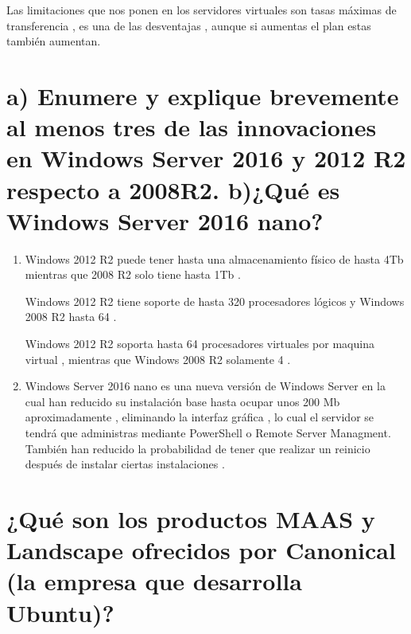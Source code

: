 Las limitaciones que nos ponen en los servidores virtuales son tasas máximas de transferencia , es una de las desventajas , aunque si aumentas el plan estas también aumentan.



\section{a) Enumere y explique brevemente al menos tres de las innovaciones en Windows Server 2016 y 2012 R2 respecto a 2008R2. b)¿Qué es Windows Server 2016 nano?}

\begin{enumerate}[label=(\alph*)]
	\item Windows 2012 R2 puede tener hasta una almacenamiento físico de hasta 4Tb mientras que 2008 R2 solo tiene hasta 1Tb \cite{comparacionMicroSer}.
	
	Windows 2012 R2 tiene soporte de hasta 320 procesadores lógicos y Windows 2008 R2 hasta 64 \cite{comparacionMicroSer}.
	
	Windows 2012 R2 soporta hasta 64 procesadores virtuales por maquina virtual , mientras que Windows 2008 R2 solamente 4 \cite{comparacionMicroSer}.
	
	\item  Windows Server 2016 nano es una nueva versión de Windows Server en la cual han reducido su instalación base hasta ocupar unos 200 Mb aproximadamente , eliminando la interfaz gráfica , lo cual el servidor se tendrá que administras mediante PowerShell o Remote Server Managment. También han reducido la probabilidad de tener que realizar un reinicio después de instalar ciertas instalaciones \cite{nanoServer}.
	
	
\end{enumerate}



\section{¿Qué son los productos MAAS y Landscape ofrecidos por Canonical (la empresa que desarrolla Ubuntu)?}

